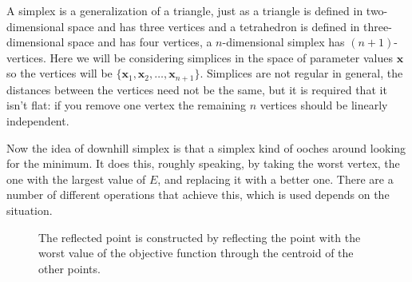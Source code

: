 \documentclass[11pt,a4paper]{scrartcl}
\begin{document}
A simplex is a generalization of a triangle, just as a triangle is
defined in two-dimensional space and has three vertices and a
tetrahedron is defined in three-dimensional space and has four
vertices, a $n$-dimensional simplex has $(n+1)$-vertices. Here we will
be considering simplices in the space of parameter values $\mathbf{x}$
so the vertices will be
$\{\mathbf{x}_1,\mathbf{x}_2,\ldots,\mathbf{x}_{n+1}\}$. Simplices are
not regular in general, the distances between the vertices need not be
the same, but it is required that it isn't flat: if you remove one
vertex the remaining $n$ vertices should be linearly independent.

Now the idea of downhill simplex is that a simplex kind of ooches
around looking for the minimum. It does this, roughly speaking, by
taking the worst vertex, the one with the largest value of $E$, and
replacing it with a better one. There are a number of different
operations that achieve this, which is used depends on the 
situation.

\begin{figure}
\begin{center}

\end{center}
\caption{The reflected point is constructed by reflecting the point
  with the worst value of the objective function through the centroid
  of the other points.\label{fig:reflection}}
\end{figure}
\end{document}
